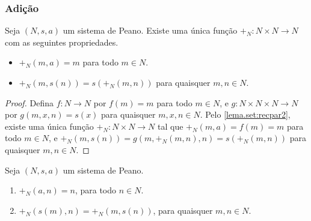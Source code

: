 \subsubsection{Adição}

\begin{corollary}
    Seja $(N,s,a)$ um sistema de Peano. Existe uma única função $+_N : N \times N \to N$ com as seguintes propriedades.
        \begin{itemize}
            \item $+_N (m,a) = m$ para todo $m \in N$.
            \item $+_N (m,s(n)) =s(+_N (m,n))$ para quaisquer $m,n \in N$.
        \end{itemize}
\end{corollary}

\begin{proof} 
    Defina $f : N \to N$ por $f(m) = m$ para todo $m \in N$, e $g : N \times N \times N \to N$ por $g(m,x,n) = s(x)$ para quaisquer $m,x,n \in N$. Pelo \cref{lema.set:recpar2}, existe uma única função $+_N : N \times N \to N$ tal que $+_N(m,a) = f(m) = m$ para todo $m \in N$, e $+_N(m,s(n)) = g(m,+_N(m,n),n) = s(+_N(m,n))$ para quaisquer $m,n \in N$. \blackproof
\end{proof}

\begin{lemma} \label{lema.set:comutatividade_soma_naturais}
    Seja $(N,s,a)$ um sistema de Peano.
        \begin{enumerate}[leftmargin=*, align=left, label=\textbf{(\alph*)}]
            \item $+_N(a,n)=n$, para todo $n \in N$.
            \item $+_N(s(m),n) = +_N(m,s(n))$, para quaisquer $m,n \in N$.
        \end{enumerate}
\end{lemma}

